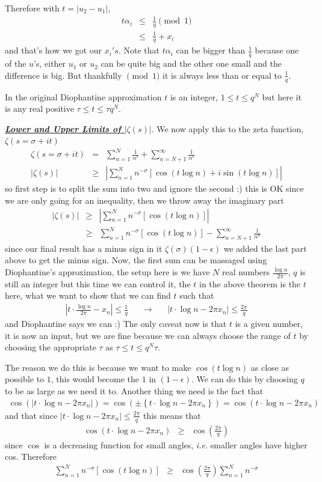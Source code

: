 \documentclass[aps,preprint,preprintnumbers,nofootinbib,showpacs,prd]{revtex4-1}
\newcommand{\ie}{{\it i.e.} }
\newcommand{\nbea}{\begin{eqnarray*}}
\newcommand{\neea}{\end{eqnarray*}}
\begin{document}
Therefore with $t = |u_2 - u_1|$,
%
\nbea
t \alpha_i & \le & \frac{1}{q} \pmod{1} \\
& \le & \frac{1}{q} + x_i
\neea
%
and that's how we got our $x_i's$. Note that $t \alpha_i$ can be bigger than $\frac{1}{q}$  because one of the $u$'s, either $u_1$ or $u_2$ can be quite big and the other one small and the difference is big. But thankfully $\pmod{1}$ it is always less than or equal to $\frac{1}{q}$.

In the original Diophantine approximation $t$ is an integer, $1 \le t \le q^N$ but here it is any real positive $\tau \le t \le \tau q^N$.


\underline{\textbf{\textit{Lower and Upper Limits of $|\zeta(s)|$}}}. We now apply this to the zeta function, $\zeta(s=\sigma + it)$ 
%
\nbea
\zeta(s=\sigma + it) & = & \sum_{n=1}^N \frac{1}{n^s} + \sum_{n = N+1}^\infty \frac{1}{n^s} \\
|\zeta(s)| & \ge & \left | \sum_{n=1}^N n^{-\sigma} [\cos (t\log n) + i\sin(t\log n)] \right |
\neea
%
so first step is to split the sum into two and ignore the second :) this is OK since we are only going for an inequality, then we throw away the imaginary part
%
\nbea
|\zeta(s)| & \ge & \left | \sum_{n=1}^N n^{-\sigma} [\cos (t\log n)] \right | \\
& \ge & \sum_{n=1}^N n^{-\sigma} [\cos (t\log n)]  - \sum_{n = N+1}^\infty \frac{1}{n^{\sigma}}
\neea
%
since our final result has a minus sign in it $\zeta(\sigma)(1 - \epsilon)$ we added the last part above to get the minus sign. Now, the first sum can be massaged using Diophantine's approximation, the setup here is we have $N$ real numbers $\frac{\log n}{2\pi}$, $q$ is still an integer but this time we can control it, the $t$ in the above theorem is the $t$ here, what we want to show that we can find $t$ such that
%
\nbea
\left | t \cdot \frac{\log n}{2 \pi} - x_n \right| \le \frac{1}{q} ~~~~~~~ \longrightarrow ~~~~~~~ \left | t \cdot \log n - 2\pi x_n \right| \le \frac{2 \pi}{q}
\neea
%
and Diophantine says we can :) The only caveat now is that $t$ is a given number, it is now an input, but we are fine because we can always choose the range of $t$ by choosing the appropriate $\tau$ as $\tau \le t \le q^N \tau$.

The reason we do this is because we want to make $\cos(t\log n)$ as close as possible to $1$, this would become the $1$ in $(1 - \epsilon)$. We can do this by choosing $q$ to be as large as we need it to. Another thing we need is the fact that 
%
\nbea
\cos \left ( \left | t \cdot \log n - 2 \pi x_n \right| \right ) = \cos \left ( \pm \left \{ t \cdot \log n - 2 \pi x_n \right\} \right ) = \cos \left ( t \cdot \log n - 2 \pi x_n \right )
\neea
%
and that since $\left | t \cdot \log n - 2\pi x_n \right| \le \frac{2 \pi}{q}$ this means that
%
\nbea
\cos \left ( t \cdot \log n - 2 \pi x_n \right ) & \ge & \cos \left ( \tfrac{2\pi}{q} \right )
\neea
%
since $\cos$ is a decreasing function for small angles, \ie smaller angles have higher cos. Therefore
%
\nbea
\sum_{n=1}^N n^{-\sigma} [\cos (t\log n)] & \ge &  \cos \left ( \tfrac{2\pi}{q} \right )\sum_{n=1}^N n^{-\sigma}
\neea
%
\end{document}
